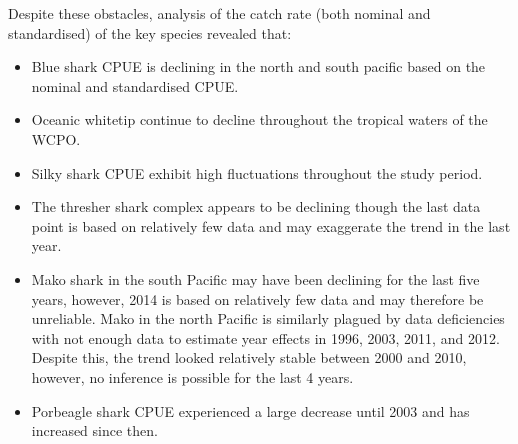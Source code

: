 Despite these obstacles, analysis of the catch rate (both nominal and standardised) of the key species revealed that:
\begin{itemize}

\item Blue shark CPUE is declining in the north and south pacific based on the nominal and standardised CPUE.

\item Oceanic whitetip continue to decline throughout the tropical waters of the WCPO.

\item Silky shark CPUE exhibit high fluctuations throughout the study period.

\item The thresher shark complex appears to be declining though the last data point is based on relatively few data and may exaggerate the trend in the last year.

\item Mako shark in the south Pacific may have been declining for the last five years, however, 2014 is based on relatively few data and may therefore be unreliable. Mako in the north Pacific is similarly plagued by data deficiencies with not enough data to estimate year effects in 1996, 2003, 2011, and 2012. Despite this, the trend looked relatively stable between 2000 and 2010, however, no inference is possible for the last 4 years.%

\item Porbeagle shark CPUE experienced a large decrease until 2003 and has increased since then.

\end{itemize}




%